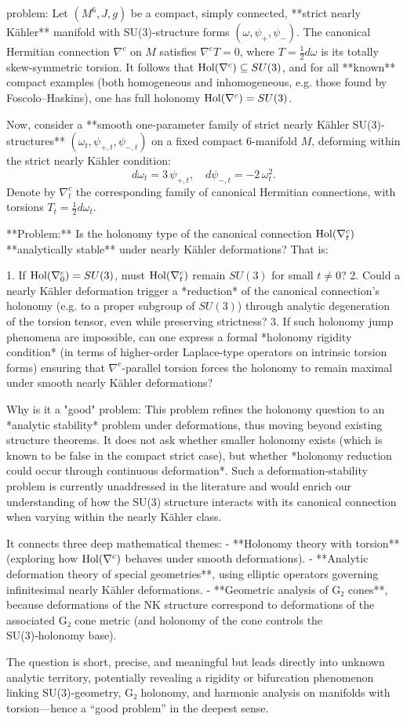 problem:  
Let \((M^6, J, g)\) be a compact, simply connected, **strict nearly Kähler** manifold with SU(3)-structure forms \((\omega, \psi_+, \psi_-)\).  
The canonical Hermitian connection \(\nabla^c\) on \(M\) satisfies \(\nabla^c T = 0\), where \(T = \frac{1}{2} d\omega\) is its totally skew-symmetric torsion.  
It follows that \({\rm Hol}(\nabla^c) \subseteq SU(3)\), and for all **known** compact examples (both homogeneous and inhomogeneous, e.g. those found by Foscolo–Haskins), one has full holonomy \({\rm Hol}(\nabla^c) = SU(3)\).  

Now, consider a **smooth one-parameter family of strict nearly Kähler SU(3)-structures** \((\omega_t, \psi_{+,t}, \psi_{-,t})\) on a fixed compact \(6\)-manifold \(M\), deforming within the strict nearly Kähler condition:  
\[
d\omega_t = 3\,\psi_{+,t}, \quad d\psi_{-,t} = -2\,\omega_t^2.
\]  
Denote by \(\nabla^c_t\) the corresponding family of canonical Hermitian connections, with torsions \(T_t = \frac{1}{2}d\omega_t\).  

**Problem:**  
Is the holonomy type of the canonical connection \({\rm Hol}(\nabla^c_t)\) **analytically stable** under nearly Kähler deformations? That is:  

1. If \({\rm Hol}(\nabla^c_0) = SU(3)\), must \({\rm Hol}(\nabla^c_t)\) remain \(SU(3)\) for small \(t\neq 0\)?  
2. Could a nearly Kähler deformation trigger a *reduction* of the canonical connection’s holonomy (e.g. to a proper subgroup of \(SU(3)\)) through analytic degeneration of the torsion tensor, even while preserving strictness?  
3. If such holonomy jump phenomena are impossible, can one express a formal *holonomy rigidity condition* (in terms of higher-order Laplace-type operators on intrinsic torsion forms) ensuring that \(\nabla^c\)-parallel torsion forces the holonomy to remain maximal under smooth nearly Kähler deformations?

Why is it a "good" problem:  
This problem refines the holonomy question to an *analytic stability* problem under deformations, thus moving beyond existing structure theorems. It does not ask whether smaller holonomy exists (which is known to be false in the compact strict case), but whether *holonomy reduction could occur through continuous deformation*. Such a deformation‑stability problem is currently unaddressed in the literature and would enrich our understanding of how the SU(3) structure interacts with its canonical connection when varying within the nearly Kähler class.  

It connects three deep mathematical themes:  
- **Holonomy theory with torsion** (exploring how \({\rm Hol}(\nabla^c)\) behaves under smooth deformations).  
- **Analytic deformation theory of special geometries**, using elliptic operators governing infinitesimal nearly Kähler deformations.  
- **Geometric analysis of G₂ cones**, because deformations of the NK structure correspond to deformations of the associated G₂ cone metric (and holonomy of the cone controls the SU(3)‑holonomy base).

The question is short, precise, and meaningful but leads directly into unknown analytic territory, potentially revealing a rigidity or bifurcation phenomenon linking SU(3)‑geometry, G₂ holonomy, and harmonic analysis on manifolds with torsion—hence a “good problem” in the deepest sense.